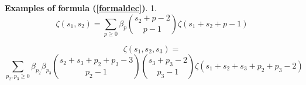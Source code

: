 \documentclass[10pt]{article}
\begin{document}
{\bf Examples of formula (\ref{formaldec})}.  1. 
$$
\zeta(s_1,  s_2) =  \sum_{p \geq 0} \beta_p \binom{  s_2+p-2 }{ p-1} \zeta(s_1+s_2+p-1)
$$


$$
\zeta(s_1,  s_2, s_3) = 
$$
\begin{equation} \label{adr11}
\sum_{ p_2, p_3 \geq 0}   \beta_{ p_2}  \beta_{ p_3} \binom{s_2+s_3 + p_2 +  p_3 -3 }{  p_2-1} \binom{  s_3 + p_3   - 2 }{  p_3-1} \zeta(s_1+s_2+ s_3 +  p_2 +  p_3   - 2) 
\end{equation}
\end{document}
